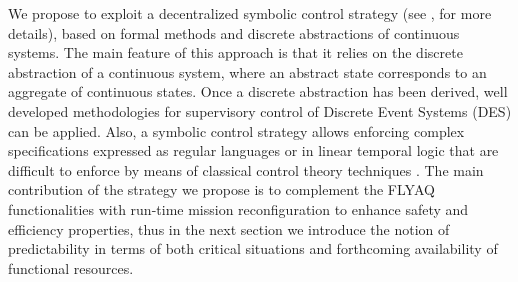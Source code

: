 \documentclass[letterpaper, 10 pt, conference]{ieeeconf}
\begin{document}
We propose to exploit a decentralized symbolic control strategy (see \cite{Pola:TAC2016}, \cite{Pola:Decentralized} for more details), based on formal methods and discrete abstractions of continuous systems. 
The main feature of this approach is that it relies on the discrete abstraction of a continuous system, where an abstract state corresponds to an aggregate of continuous states. Once a discrete abstraction has been derived, well developed methodologies for supervisory control of Discrete Event Systems (DES) can be applied.
Also, a symbolic control strategy allows  enforcing complex specifications expressed as regular languages or in linear temporal logic that are difficult to enforce by means of classical control theory techniques \cite{Pola:Decentralized}. 
%
The main contribution of the strategy we propose is to complement the FLYAQ functionalities with run-time mission reconfiguration to enhance safety and efficiency properties, thus in the next section we introduce the notion of predictability in terms of both critical situations and forthcoming availability of functional resources.
\end{document}

